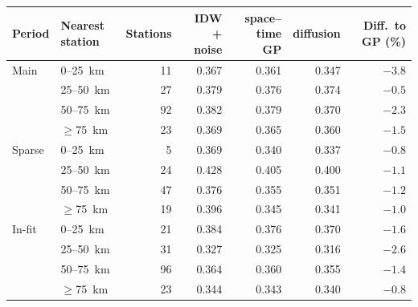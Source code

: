 \begin{tabular}{llrrrrr}
\toprule
Period & Nearest station & Stations & IDW + noise & space--time GP & diffusion & Diff.\ to GP (\%) \\
\midrule
Main & 0--25~km & 11 & 0.367 & 0.361 & 0.347 & $-3.8$ \\
 & 25--50~km & 27 & 0.379 & 0.376 & 0.374 & $-0.5$ \\
 & 50--75~km & 92 & 0.382 & 0.379 & 0.370 & $-2.3$ \\
 & $\geq$75~km & 23 & 0.369 & 0.365 & 0.360 & $-1.5$ \\
\addlinespace
Sparse & 0--25~km & 5 & 0.369 & 0.340 & 0.337 & $-0.8$ \\
 & 25--50~km & 24 & 0.428 & 0.405 & 0.400 & $-1.1$ \\
 & 50--75~km & 47 & 0.376 & 0.355 & 0.351 & $-1.2$ \\
 & $\geq$75~km & 19 & 0.396 & 0.345 & 0.341 & $-1.0$ \\
\addlinespace
In-fit & 0--25~km & 21 & 0.384 & 0.376 & 0.370 & $-1.6$ \\
 & 25--50~km & 31 & 0.327 & 0.325 & 0.316 & $-2.6$ \\
 & 50--75~km & 96 & 0.364 & 0.360 & 0.355 & $-1.4$ \\
 & $\geq$75~km & 23 & 0.344 & 0.343 & 0.340 & $-0.8$ \\
\bottomrule
\end{tabular}
